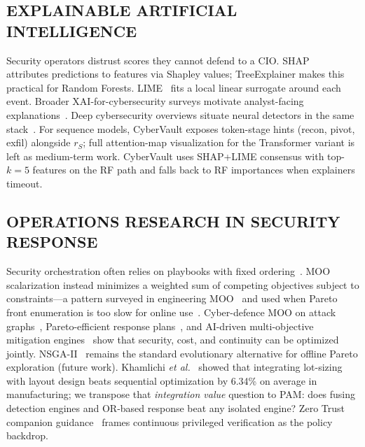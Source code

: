\documentclass{ieeeaccess}
\begin{document}
\subsection{EXPLAINABLE ARTIFICIAL INTELLIGENCE}
Security operators distrust scores they cannot defend to a CIO. SHAP~\cite{ref12} attributes predictions to features via Shapley values; TreeExplainer makes this practical for Random Forests. LIME~\cite{ref13} fits a local linear surrogate around each event. Broader XAI-for-cybersecurity surveys motivate analyst-facing explanations~\cite{ref25}. Deep cybersecurity overviews situate neural detectors in the same stack~\cite{ref46}. For sequence models, CyberVault exposes token-stage hints (recon, pivot, exfil) alongside $r_S$; full attention-map visualization for the Transformer variant is left as medium-term work. CyberVault uses SHAP+LIME consensus with top-$k=5$ features on the RF path and falls back to RF importances when explainers timeout.

\subsection{OPERATIONS RESEARCH IN SECURITY RESPONSE}
Security orchestration often relies on playbooks with fixed ordering~\cite{ref15,ref41}. MOO scalarization instead minimizes a weighted sum of competing objectives subject to constraints---a pattern surveyed in engineering MOO~\cite{ref39} and used when Pareto front enumeration is too slow for online use~\cite{ref14,ref33,ref38}. Cyber-defence MOO on attack graphs~\cite{ref33}, Pareto-efficient response plans~\cite{ref38}, and AI-driven multi-objective mitigation engines~\cite{ref34} show that security, cost, and continuity can be optimized jointly. NSGA-II~\cite{ref35} remains the standard evolutionary alternative for offline Pareto exploration (future work). Khamlichi \textit{et al.}~\cite{ref14} showed that integrating lot-sizing with layout design beats sequential optimization by 6.34\% on average in manufacturing; we transpose that \textit{integration value} question to PAM: does fusing detection engines and OR-based response beat any isolated engine? Zero Trust companion guidance~\cite{ref22,ref47} frames continuous privileged verification as the policy backdrop.
\end{document}
